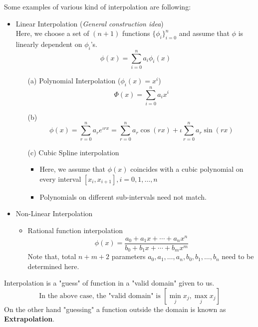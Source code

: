 \begin{example}
	Some examples of various kind of interpolation are following:
	\begin{itemize}
		\item Linear Interpolation (\textit{General construction idea})
		      \\ Here, we choose a set of $(n+1)$ functions $ \{\phi_i\}_{i=0}^n $ and assume that $\phi$ is linearly dependent on $\phi_i$'s.
		      \[
			      \phi(x) = \sum_{i=0}^{n}a_i\phi_i(x)
		      \]
		      \begin{itemize}
			      \item[(a)] Polynomial Interpolation ($ \phi_i(x) = x^i $)
				      \[
					      \Phi(x) = \sum_{i=0}^{n}a_ix^i
				      \]
			      \item[(b)] \[\phi(x) = \sum_{r=0}^{n}a_re^{\iota rx} = \sum_{r=0}^{n}a_r\cos(rx) + \iota\sum_{r=0}^{n}a_r\sin(rx) \]
			      \item[(c)] Cubic Spline interpolation
				      \begin{itemize}
					      \item Here, we assume that $ \phi(x) $ coincides with a cubic polynomial on every interval $ [x_i,x_{i+1}], i = 0,1,\ldots,n $
					      \item Polynomials on different sub-intervals need not match.
				      \end{itemize}
		      \end{itemize}
		\item Non-Linear Interpolation
		      \begin{itemize}
			      \item Rational function interpolation
			            \[
				            \phi(x) = \frac{a_0+a_1x+\cdots+a_nx^n}{b_0+b_1x+\cdots+b_mx^m}
			            \]
			            Note that, total $ n+m+2 $ parameters $ a_0,a_1,\ldots,a_n,b_0,b_1,\ldots,b_n $ need to be determined here.
		      \end{itemize}
	\end{itemize}

\end{example}

\begin{rmk}
	Interpolation is a "guess" of function in a "valid domain" given to us.
	\[ \text{In the above case, the "valid domain" is  } [\min_j x_j, \max_j x_j] \]
	On the other hand "guessing" a function outside the domain is known as \textbf{Extrapolation}.
\end{rmk}






